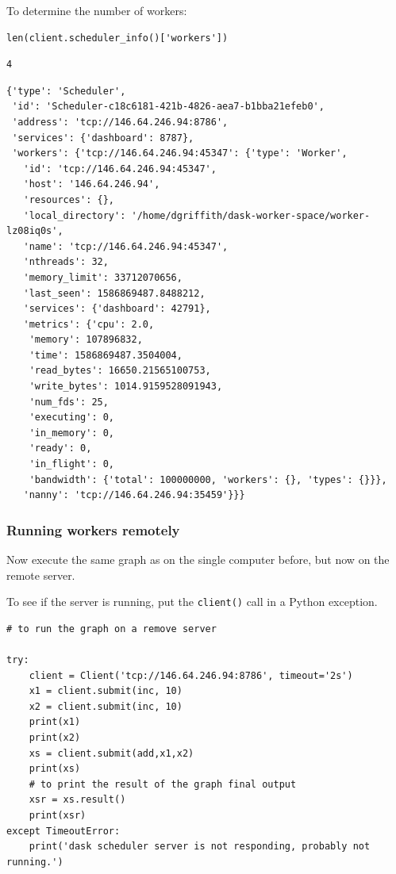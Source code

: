 \begin{enumerate}
To determine the number of workers:
\begin{lstlisting}[style=tinysize]
len(client.scheduler_info()['workers'])
\end{lstlisting}

\begin{lstlisting}[style=outcellstyle]
4
\end{lstlisting}


\begin{lstlisting}[style=outcellstyle]
{'type': 'Scheduler',
 'id': 'Scheduler-c18c6181-421b-4826-aea7-b1bba21efeb0',
 'address': 'tcp://146.64.246.94:8786',
 'services': {'dashboard': 8787},
 'workers': {'tcp://146.64.246.94:45347': {'type': 'Worker',
   'id': 'tcp://146.64.246.94:45347',
   'host': '146.64.246.94',
   'resources': {},
   'local_directory': '/home/dgriffith/dask-worker-space/worker-lz08iq0s',
   'name': 'tcp://146.64.246.94:45347',
   'nthreads': 32,
   'memory_limit': 33712070656,
   'last_seen': 1586869487.8488212,
   'services': {'dashboard': 42791},
   'metrics': {'cpu': 2.0,
    'memory': 107896832,
    'time': 1586869487.3504004,
    'read_bytes': 16650.21565100753,
    'write_bytes': 1014.9159528091943,
    'num_fds': 25,
    'executing': 0,
    'in_memory': 0,
    'ready': 0,
    'in_flight': 0,
    'bandwidth': {'total': 100000000, 'workers': {}, 'types': {}}},
   'nanny': 'tcp://146.64.246.94:35459'}}}
\end{lstlisting}

\end{enumerate}



\subsubsection{Running workers remotely}
\label{sec:Runningworkersremotely}

Now execute the same graph as on the single computer before, but now on the remote server.


To see if the server is running, put the \verb+client()+ call in a Python exception.



\begin{lstlisting}[style=incellstyle]
# to run the graph on a remove server

try:
    client = Client('tcp://146.64.246.94:8786', timeout='2s')
    x1 = client.submit(inc, 10)
    x2 = client.submit(inc, 10)
    print(x1)
    print(x2)
    xs = client.submit(add,x1,x2)
    print(xs)
    # to print the result of the graph final output
    xsr = xs.result()
    print(xsr)
except TimeoutError:
    print('dask scheduler server is not responding, probably not running.')

\end{lstlisting}


